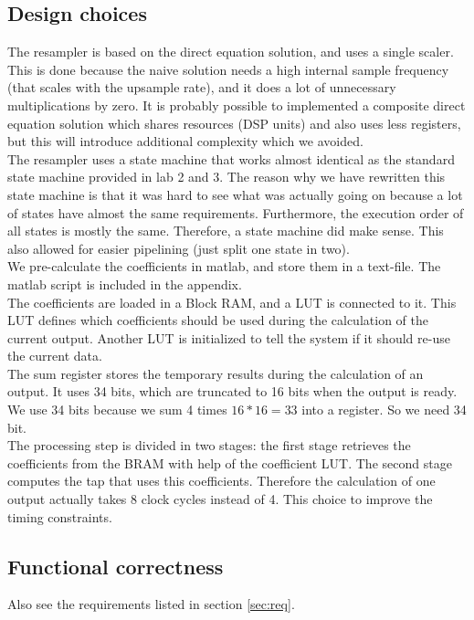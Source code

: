 \documentclass[a4paper,twoside,11pt, fleqn]{article}
\begin{document}
\newpage
\subsection{Design choices}
The resampler is based on the direct equation solution, and uses a single scaler. This is done because the naive solution needs a high internal sample frequency (that scales  with the upsample rate), and it does a lot of unnecessary multiplications by zero. It is probably possible to implemented a composite direct equation solution which shares resources (DSP units) and also uses less registers, but this will introduce additional complexity which we avoided.\\

The resampler uses a state machine that works almost identical as the standard state machine provided in lab 2 and 3. The reason why we have rewritten this state machine is that it was hard to see what was actually going on because a lot of states have almost the same requirements. Furthermore, the execution order of all states is mostly the same. Therefore, a state machine did make sense. This also allowed for easier pipelining (just split one state in two).\\

We pre-calculate the coefficients in matlab, and store them in a text-file. The matlab script is included in the appendix.\\

The coefficients are loaded in a Block RAM, and a LUT is connected to it. This LUT defines which coefficients should be used during the calculation of the current output. Another LUT is initialized to tell the system if it should re-use the current data.\\

The sum register stores the temporary results during the calculation of an output. It uses 34 bits, which are truncated to 16 bits when the output is ready. We use 34 bits because we sum 4 times $16*16=33$ into a register. So we need 34 bit. \\

The processing step is divided in two stages: the first stage retrieves the coefficients from the BRAM with help of the coefficient LUT. The second stage computes the tap that uses this coefficients. Therefore the calculation of one output actually takes 8 clock cycles instead of 4. This choice to improve the timing constraints.

\subsection{Functional correctness}
Also see the requirements listed in section \ref{sec:req}.
\end{document}

